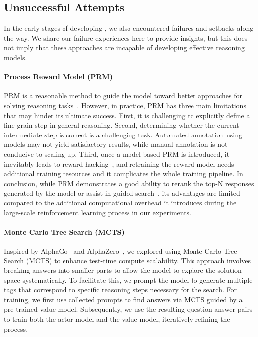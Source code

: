 \subsection{Unsuccessful Attempts} \label{sec:attempt}
In the early stages of developing \dsri{}, we also encountered failures and setbacks along the way. We share our failure experiences here to provide insights, but this does not imply that these approaches are incapable of developing effective reasoning models.

\paragraph{Process Reward Model (PRM)}
PRM is a reasonable method to guide the model toward better approaches for solving reasoning tasks~\citep{uesato2022solving, lightman2023let,mathshepherd}. However, in practice, PRM has three main limitations that may hinder its ultimate success. First, it is challenging to explicitly define a fine-grain step in general reasoning. 
Second, determining whether the current intermediate step is correct is a challenging task. Automated annotation using models may not yield satisfactory results, while manual annotation is not conducive to scaling up.
Third, once a model-based PRM is introduced, it inevitably leads to reward hacking~\citep{gao2022scalinglawsrewardmodel},  and retraining the reward model needs additional training resources and it complicates the whole training pipeline. In conclusion, while PRM demonstrates a good ability to rerank the top-N responses generated by the model or assist in guided search~\citep{snell2024scalingllmtesttimecompute}, its advantages are limited compared to the additional computational overhead it introduces during the large-scale reinforcement learning process in our experiments.

\paragraph{Monte Carlo Tree Search (MCTS)}
Inspired by AlphaGo~\citep{alphago} and AlphaZero~\citep{alphazero}, we explored using Monte Carlo Tree Search (MCTS) to enhance test-time compute scalability. This approach involves breaking answers into smaller parts to allow the model to explore the solution space systematically. To facilitate this, we prompt the model to generate multiple tags that correspond to specific reasoning steps necessary for the search. For training, we first use collected prompts to find answers via MCTS guided by a pre-trained value model. Subsequently, we use the resulting question-answer pairs to train both the actor model and the value model, iteratively refining the process.

